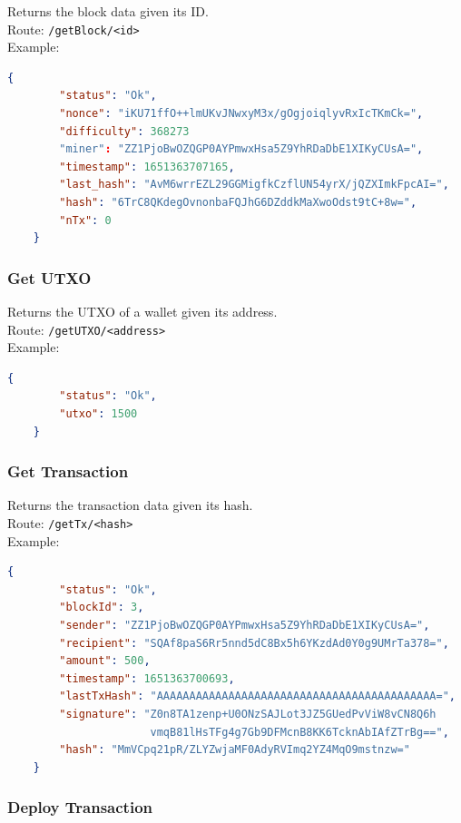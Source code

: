 \documentclass[../documentation.tex]{subfiles}
\begin{document}
Returns the block data given its ID.
\\
Route: \texttt{/getBlock/<id>}
\\
Example:
\begin{lstlisting}[language=json]
    {
        "status": "Ok",
        "nonce": "iKU71ffO++lmUKvJNwxyM3x/gOgjoiqlyvRxIcTKmCk=",
        "difficulty": 368273
        "miner": "ZZ1PjoBwOZQGP0AYPmwxHsa5Z9YhRDaDbE1XIKyCUsA=",
        "timestamp": 1651363707165,
        "last_hash": "AvM6wrrEZL29GGMigfkCzflUN54yrX/jQZXImkFpcAI=",
        "hash": "6TrC8QKdegOvnonbaFQJhG6DZddkMaXwoOdst9tC+8w=",
        "nTx": 0
    }
\end{lstlisting}

\subsubsection{Get UTXO}

Returns the UTXO of a wallet given its address.
\\
Route: \texttt{/getUTXO/<address>}
\\
Example:
\begin{lstlisting}[language=json]
    {
        "status": "Ok",
        "utxo": 1500
    }
\end{lstlisting}

\pagebreak

\subsubsection{Get Transaction}

Returns the transaction data given its hash.
\\
Route: \texttt{/getTx/<hash>}
\\
Example:
\begin{lstlisting}[language=json]
    {
        "status": "Ok",
        "blockId": 3,
        "sender": "ZZ1PjoBwOZQGP0AYPmwxHsa5Z9YhRDaDbE1XIKyCUsA=",
        "recipient": "SQAf8paS6Rr5nnd5dC8Bx5h6YKzdAd0Y0g9UMrTa378=",
        "amount": 500,
        "timestamp": 1651363700693,
        "lastTxHash": "AAAAAAAAAAAAAAAAAAAAAAAAAAAAAAAAAAAAAAAAAAA=",
        "signature": "Z0n8TA1zenp+U0ONzSAJLot3JZ5GUedPvViW8vCN8Q6h
                      vmqB81lHsTFg4g7Gb9DFMcnB8KK6TcknAbIAfZTrBg==",
        "hash": "MmVCpq21pR/ZLYZwjaMF0AdyRVImq2YZ4MqO9mstnzw="
    }
\end{lstlisting}

\subsubsection{Deploy Transaction}
\end{document}
